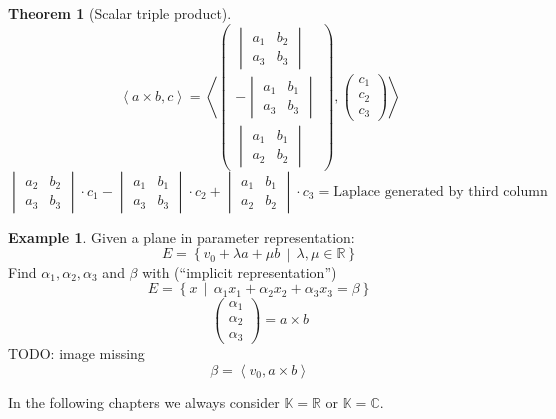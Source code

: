 \documentclass[a4paper,landscape,twocolumn]{article}
\newcommand\setdef[2]{\left\{#1\,\middle|\,#2\right\}}
\newcommand\functional[1]{\left\langle{#1}\right\rangle}
\theoremstyle{definition}
\newtheorem{theorem}{Theorem}
\newtheorem{ex}{Example}
\begin{document}
\begin{theorem}[Scalar triple product]
  \[
    \functional{a \times b, c} = \functional{
      \begin{pmatrix}
        \begin{vmatrix}
          a_1 & b_2 \\
          a_3 & b_3
        \end{vmatrix} \\
        - \begin{vmatrix}
          a_1 & b_1 \\
          a_3 & b_3
        \end{vmatrix} \\
        \begin{vmatrix}
          a_1 & b_1 \\
          a_2 & b_2
        \end{vmatrix}
      \end{pmatrix},
      \begin{pmatrix} c_1 \\ c_2 \\ c_3 \end{pmatrix}
    }
  \] \[
    \begin{vmatrix} a_2 & b_2 \\ a_3 & b_3 \end{vmatrix} \cdot c_1
    - \begin{vmatrix} a_1 & b_1 \\ a_3 & b_3 \end{vmatrix} \cdot c_2
    + \begin{vmatrix} a_1 & b_1 \\ a_2 & b_2 \end{vmatrix} \cdot c_3
    = \text{Laplace generated by third column}
  \]
\end{theorem}
\begin{ex}
  \label{application-8.12}
  Given a plane in parameter representation:
  \[ E = \setdef{v_0 + \lambda a + \mu b}{\lambda, \mu \in \mathbb R} \]
  Find $\alpha_1, \alpha_2, \alpha_3$ and $\beta$ with (\enquote{implicit representation})
  \[ E = \setdef{x}{\alpha_1 x_1 + \alpha_2 x_2 + \alpha_3 x_3 = \beta}\]
  \[
    \begin{pmatrix} \alpha_1 \\ \alpha_2 \\ \alpha_3 \end{pmatrix}
    = a \times b
  \]
  TODO: image missing
  \[ \beta = \functional{v_0, a \times b} \]
\end{ex}

In the following chapters we always consider $\mathbb K = \mathbb R$ or $\mathbb K = \mathbb C$.
\end{document}
